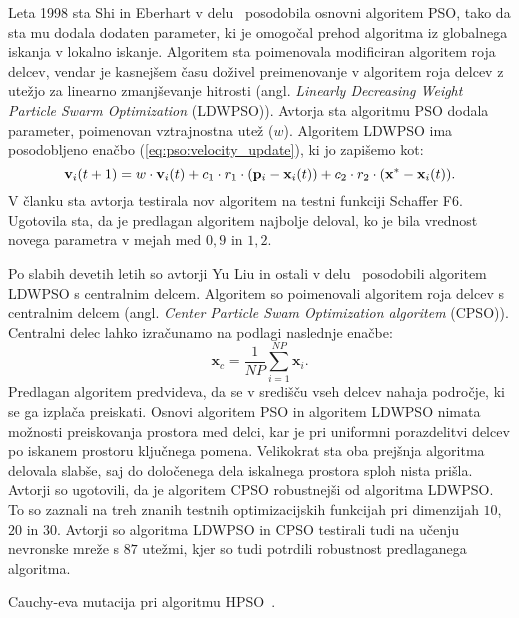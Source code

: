 Leta 1998 sta Shi in Eberhart v delu~\cite{alg:ldwpso} posodobila osnovni algoritem PSO, tako da sta mu dodala dodaten parameter, ki je omogočal prehod algoritma iz globalnega iskanja v lokalno iskanje.
Algoritem sta poimenovala modificiran algoritem roja delcev, vendar je kasnejšem času doživel preimenovanje v algoritem roja delcev z utežjo za linearno zmanjševanje hitrosti (angl. \textit{Linearly Decreasing Weight Particle Swarm Optimization} (LDWPSO)).
Avtorja sta algoritmu PSO dodala parameter, poimenovan vztrajnostna utež ($w$).
Algoritem LDWPSO ima posodobljeno enačbo (\ref{eq:pso:velocity_update}), ki jo zapišemo kot:
\begin{equation}
    \mathbf{v}_i(t + 1) = w \cdot \mathbf{v}_i(t) + c_1 \cdot r_1 \cdot (\mathbf{p}_i - \mathbf{x}_i(t)) + c_2 \cdot r_2 \cdot (\mathbf{x}^* - \mathbf{x}_i(t)).\label{eq:ldwpso:velocity_update} \\
\end{equation}
V članku sta avtorja testirala nov algoritem na testni funkciji Schaffer F6.
Ugotovila sta, da je predlagan algoritem najbolje deloval, ko je bila vrednost novega parametra v mejah med $0{,}9$ in $1{,}2$.

Po slabih devetih letih so avtorji Yu Liu in ostali v delu~\cite{alg:cpso} posodobili algoritem LDWPSO s centralnim delcem.
Algoritem so poimenovali algoritem roja delcev s centralnim delcem (angl. \textit{Center Particle Swam Optimization algoritem} (CPSO)).
Centralni delec lahko izračunamo na podlagi naslednje enačbe:
\begin{equation}
    \mathbf{x}_c = \frac{1}{\mathit{NP}} \sum_{i=1}^{\mathit{NP}} \mathbf{x}_i.
\end{equation}
Predlagan algoritem predvideva, da se v središču vseh delcev nahaja področje, ki se ga izplača preiskati.
Osnovi algoritem PSO in algoritem LDWPSO nimata možnosti preiskovanja prostora med delci, kar je pri uniformni porazdelitvi delcev po iskanem prostoru ključnega pomena.
Velikokrat sta oba prejšnja algoritma delovala slabše, saj do določenega dela iskalnega prostora sploh nista prišla.
Avtorji so ugotovili, da je algoritem CPSO robustnejši od algoritma LDWPSO.
To so zaznali na treh znanih testnih optimizacijskih funkcijah pri dimenzijah $10$, $20$ in $30$.  
Avtorji so algoritma LDWPSO in CPSO testirali tudi na učenju nevronske mreže s $87$ utežmi, kjer so tudi potrdili robustnost predlaganega algoritma.

\begin{algorithm}
    \DontPrintSemicolon


    \caption{Cauchy-eva mutacija pri algoritmu HPSO~\cite{alg:mpso}.}\label{pcode:hpso:addition}
\end{algorithm}

